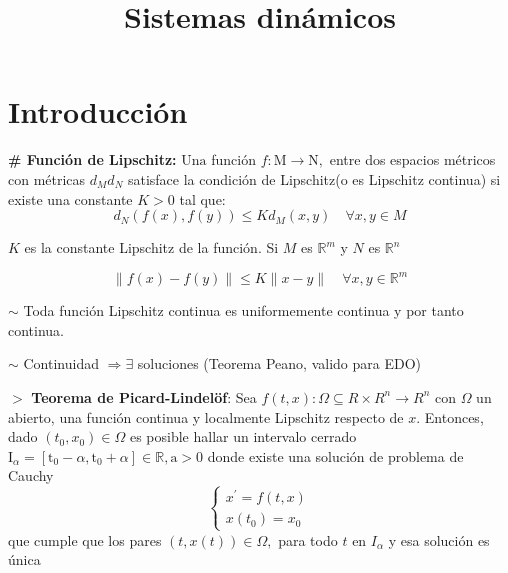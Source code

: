 \documentclass[%
 reprint,
 amsmath,amssymb,
 aps,
]{revtex4-1}
\begin{document}

\title{Sistemas dinámicos}%


\maketitle


\section{Introducción}

\textbf{\# Función de Lipschitz: }
$\mathrm{Una}$ función ${f}: \mathrm{M} \rightarrow \mathrm{N},$ entre dos espacios métricos con métricas $d_{M} d_{N}$ satisface la condición de Lipschitz(o es Lipschitz continua) si existe una constante $K>0$ tal que:
$$
d_{N}(f(x), f(y)) \leq K d_{M}(x, y) \quad \forall x, y \in M
$$


$K$ es la constante Lipschitz de la función.
Si $M$ es $\mathbb{R}^{m}$ y $N$ es $\mathbb{R}^{n}$


$$
\|f(x)-f(y)\| \leq K\|x-y\| \quad \forall x, y \in \mathbb{R}^{m}
$$

$\sim$ Toda función Lipschitz continua es uniformemente continua y por tanto continua.

$\sim$ Continuidad $\Rightarrow \exists$ soluciones (Teorema Peano, valido para EDO) 

$>$ \textbf{Teorema de Picard-Lindelöf}:  Sea $f(t, x): \Omega \subseteq R \times R^{n} \rightarrow R^{n}$ con $\Omega$ un abierto, una función continua y localmente Lipschitz respecto de $x$. Entonces, dado $\left(t_{0}, x_{0}\right) \in \Omega$ es posible hallar un intervalo cerrado $\mathrm{I}_{\alpha}=\left[\mathrm{t}_{0}-\alpha, \mathrm{t}_{0}+\alpha\right] \in \mathbb{R}, \mathrm{a}>0$ donde existe una
solución de problema de Cauchy
$$
\left\{\begin{array}{l}
x^{\prime}=f(t, x) \\
x\left(t_{0}\right)=x_{0}
\end{array}\right.
$$
que cumple que los pares $(t, x(t)) \in \Omega,$ para todo $t$ en $I_{\alpha}$ y esa solución es única
\end{document}

